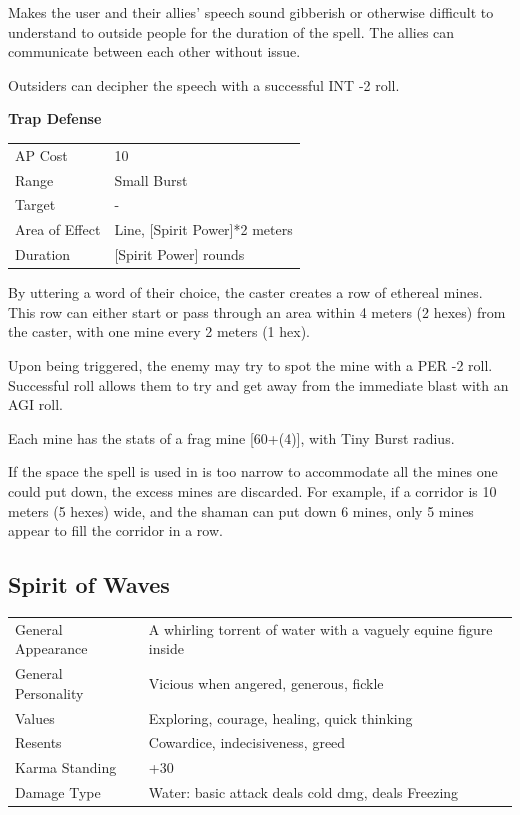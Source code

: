 \documentclass[11pt,a4paper,twocolumn]{book}
\begin{document}
Makes the user and their allies' speech sound gibberish or otherwise difficult to understand to outside people for the duration of the spell. The allies can communicate between each other without issue.

Outsiders can decipher the speech with a successful INT -2 roll.

\bigskip
\noindent
\textbf{Trap Defense}

\smallskip
{
	\begin{tabu} to 70mm{| X[l,4] | X[l,7] |}
		\hline
        AP Cost	      	& 10 						\\
        Range     		& Small Burst				\\
        Target      	& -		\\
        Area of Effect  & Line, [Spirit Power]*2 meters  	 			\\
        Duration     	& [Spirit Power] rounds		\\ \hline
	\end{tabu}
		
}
\smallskip

By uttering a word of their choice, the caster creates a row of ethereal mines. This row can either start or pass through an area within 4 meters (2 hexes) from the caster, with one mine every 2 meters (1 hex).

Upon being triggered, the enemy may try to spot the mine with a PER -2 roll. Successful roll allows them to try and get away from the immediate blast with an AGI roll.

Each mine has the stats of a frag mine [60+(4)], with Tiny Burst radius.

If the space the spell is used in is too narrow to accommodate all the mines one could put down, the excess mines are discarded. For example, if a corridor is 10 meters (5 hexes) wide, and the shaman can put down 6 mines, only 5 mines appear to fill the corridor in a row.

\bigskip   
\vfill

\pagebreak
\subsection*{Spirit of Waves}
{
	\begin{tabu} to 75mm{| X[l,4] | X[l,8] |}
		\hline
		General Appearance		& A whirling torrent of water with a vaguely equine figure inside		\\
        General Personality	   	& Vicious when angered, generous, fickle								\\
        Values     				& Exploring, courage, healing, quick thinking							\\
        Resents     			& Cowardice, indecisiveness, greed 										\\
        Karma Standing      	& +30																	\\
        Damage Type 			& Water: basic attack deals cold dmg, deals Freezing	 				\\ \hline
	\end{tabu}
		
}
\end{document}
